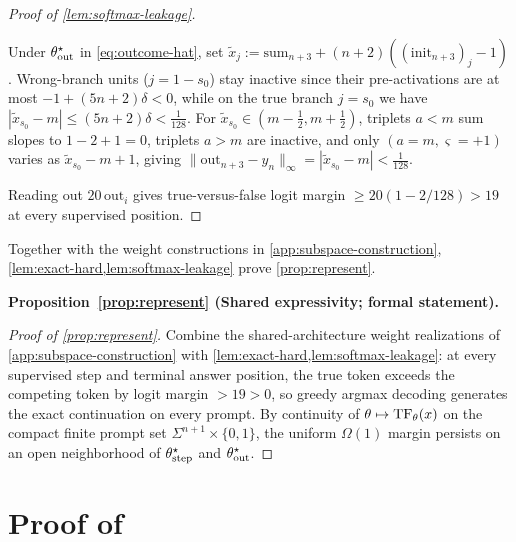 \begin{proof}[Proof of \cref{lem:softmax-leakage}]
\begin{enumerate}[label=(\arabic*),leftmargin=*]
Under $\theta^\star_{\mathrm{out}}$ in \cref{eq:outcome-hat}, set $\tilde x_j := \mathrm{sum}_{n+3} + (n+2)((\mathrm{init}_{n+3})_j - 1)$. Wrong-branch units ($j = 1 - s_0$) stay inactive since their pre-activations are at most $-1 + (5n+2)\delta < 0$, while on the true branch $j = s_0$ we have $|\tilde x_{s_0} - m| \le (5n+2)\delta < \frac{1}{128}$. For $\tilde x_{s_0} \in (m - \frac{1}{2}, m + \frac{1}{2})$, triplets $a < m$ sum slopes to $1 - 2 + 1 = 0$, triplets $a > m$ are inactive, and only $(a=m, \varsigma=+1)$ varies as $\tilde x_{s_0} - m + 1$, giving $\|\mathrm{out}_{n+3} - y_n\|_\infty = |\tilde x_{s_0} - m| < \frac{1}{128}$.
\end{enumerate}
Reading out $20\,\mathrm{out}_i$ gives true-versus-false logit margin $\ge 20(1 - 2/128) > 19$ at every supervised position.
\end{proof}

Together with the weight constructions in \cref{app:subspace-construction}, \cref{lem:exact-hard,lem:softmax-leakage} prove \cref{prop:represent}.

\par\bigskip\noindent\textbf{Proposition~\ref{prop:represent} (Shared expressivity; formal statement).}\par\smallskip

\begin{proof}[Proof of \cref{prop:represent}]
Combine the shared-architecture weight realizations of \cref{app:subspace-construction} with \cref{lem:exact-hard,lem:softmax-leakage}: at every supervised step and terminal answer position, the true token exceeds the competing token by logit margin $> 19 > 0$, so greedy argmax decoding generates the exact continuation on every prompt. By continuity of $\theta \mapsto \operatorname{TF}_\theta(x)$ on the compact finite prompt set $\Sigma^{n+1}\times\{0,1\}$, the uniform $\Omega(1)$ margin persists on an open neighborhood of $\theta^\star_{\mathrm{step}}$ and $\theta^\star_{\mathrm{out}}$.
\end{proof}

\section{Proof of \texorpdfstring{}{Theorem 1}}
\label{app:damping-proof}
\label{app:mainproofs}

